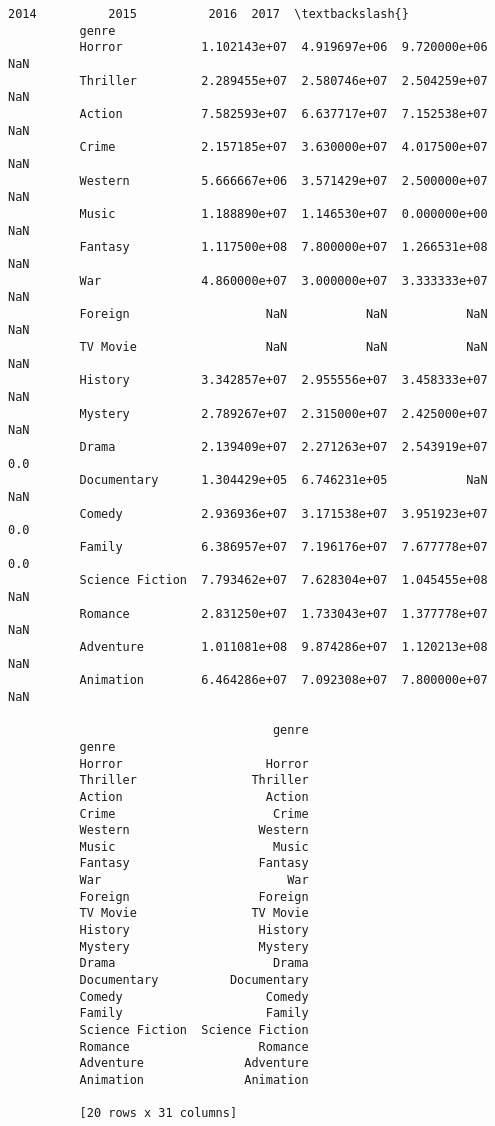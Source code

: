 \documentclass[11pt]{article}
\begin{document}
\begin{Verbatim}[commandchars=\\\{\}]
                                   2014          2015          2016  2017  \textbackslash{}
          genre                                                             
          Horror           1.102143e+07  4.919697e+06  9.720000e+06   NaN   
          Thriller         2.289455e+07  2.580746e+07  2.504259e+07   NaN   
          Action           7.582593e+07  6.637717e+07  7.152538e+07   NaN   
          Crime            2.157185e+07  3.630000e+07  4.017500e+07   NaN   
          Western          5.666667e+06  3.571429e+07  2.500000e+07   NaN   
          Music            1.188890e+07  1.146530e+07  0.000000e+00   NaN   
          Fantasy          1.117500e+08  7.800000e+07  1.266531e+08   NaN   
          War              4.860000e+07  3.000000e+07  3.333333e+07   NaN   
          Foreign                   NaN           NaN           NaN   NaN   
          TV Movie                  NaN           NaN           NaN   NaN   
          History          3.342857e+07  2.955556e+07  3.458333e+07   NaN   
          Mystery          2.789267e+07  2.315000e+07  2.425000e+07   NaN   
          Drama            2.139409e+07  2.271263e+07  2.543919e+07   0.0   
          Documentary      1.304429e+05  6.746231e+05           NaN   NaN   
          Comedy           2.936936e+07  3.171538e+07  3.951923e+07   0.0   
          Family           6.386957e+07  7.196176e+07  7.677778e+07   0.0   
          Science Fiction  7.793462e+07  7.628304e+07  1.045455e+08   NaN   
          Romance          2.831250e+07  1.733043e+07  1.377778e+07   NaN   
          Adventure        1.011081e+08  9.874286e+07  1.120213e+08   NaN   
          Animation        6.464286e+07  7.092308e+07  7.800000e+07   NaN   
          
                                     genre  
          genre                             
          Horror                    Horror  
          Thriller                Thriller  
          Action                    Action  
          Crime                      Crime  
          Western                  Western  
          Music                      Music  
          Fantasy                  Fantasy  
          War                          War  
          Foreign                  Foreign  
          TV Movie                TV Movie  
          History                  History  
          Mystery                  Mystery  
          Drama                      Drama  
          Documentary          Documentary  
          Comedy                    Comedy  
          Family                    Family  
          Science Fiction  Science Fiction  
          Romance                  Romance  
          Adventure              Adventure  
          Animation              Animation  
          
          [20 rows x 31 columns]
\end{Verbatim}
            
\end{document}
